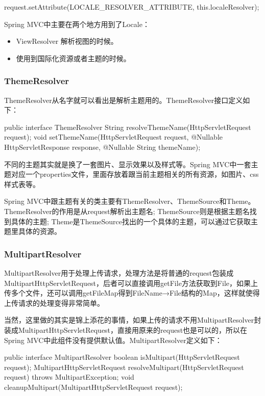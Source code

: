 \begin{Java}
request.setAttribute(LOCALE_RESOLVER_ATTRIBUTE, this.localeResolver);
\end{Java}

Spring MVC中主要在两个地方用到了Locale：
\begin{itemize}
    \item ViewResolver 解析视图的时候。
    \item 使用到国际化资源或者主题的时候。
\end{itemize}

\subsubsection*{ThemeResolver}

ThemeResolver从名字就可以看出是解析主题用的。ThemeResolver接口定义如下：

\begin{Java}
public interface ThemeResolver {
    String resolveThemeName(HttpServletRequest request);
    void setThemeName(HttpServletRequest request, @Nullable HttpServletResponse response, @Nullable String themeName);
}
\end{Java}

不同的主题其实就是换了一套图片、显示效果以及样式等。Spring MVC中一套主题对应一个properties文件，里面存放着跟当前主题相关的所有资源，如图片、css样式表等。

Spring MVC中跟主题有关的类主要有ThemeResolver、ThemeSource和Theme。ThemeResolver的作用是从request解析出主题名; ThemeSource则是根据主题名找到具体的主题; Theme是ThemeSource找出的一个具体的主题，可以通过它获取主题里具体的资源。

\subsubsection*{MultipartResolver}

MultipartResolver用于处理上传请求，处理方法是将普通的request包装成MultipartHttpServletRequest，后者可以直接调用getFile方法获取到File，如果上传多个文件，还可以调用getFileMap得到FileName→File结构的Map，这样就使得上传请求的处理变得非常简单。

当然，这里做的其实是锦上添花的事情，如果上传的请求不用MultipartResolver封装成MultipartHttpServletRequest，直接用原来的request也是可以的，所以在Spring MVC中此组件没有提供默认值。MultipartResolver定义如下：

\begin{Java}
public interface MultipartResolver {
    boolean isMultipart(HttpServletRequest request);
    MultipartHttpServletRequest resolveMultipart(HttpServletRequest request) throws MultipartException;
    void cleanupMultipart(MultipartHttpServletRequest request);
}
\end{Java}

